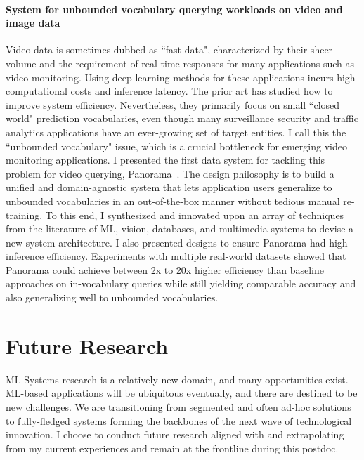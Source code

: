 \documentclass[letterpaper]{article}
\begin{document}
\paragraph{System for unbounded vocabulary querying workloads on video and image data} Video data is sometimes dubbed as ``fast data", characterized by their sheer volume and the requirement of real-time responses for many applications such as video monitoring. Using deep learning methods for these applications incurs high computational costs and inference latency. The prior art has studied how to improve system efficiency. Nevertheless, they primarily focus on small ``closed world" prediction vocabularies, even though many surveillance security and traffic analytics applications have an ever-growing set of target entities. I call this the ``unbounded vocabulary" issue, which is a crucial bottleneck for emerging video monitoring applications. I presented the first data system for tackling this problem for video querying, Panorama~\cite{panorama}. The design philosophy
is to build a unified and domain-agnostic system that lets
application users generalize to unbounded vocabularies in an
out-of-the-box manner without tedious manual re-training.
To this end, I synthesized and innovated upon an array of
techniques from the literature of ML, vision, databases, and multimedia systems to devise a new system architecture.
I also presented designs to ensure Panorama had high
inference efficiency. Experiments with multiple real-world
datasets showed that Panorama could achieve between 2x to 20x
higher efficiency than baseline approaches on in-vocabulary
queries while still yielding comparable accuracy and also
generalizing well to unbounded vocabularies.


\section*{Future Research}
ML Systems research is a relatively new domain, and many opportunities exist. ML-based applications will be ubiquitous eventually, and there are destined to be new challenges. We are transitioning from segmented and often ad-hoc solutions to fully-fledged systems forming the backbones of the next wave of technological innovation. I choose to conduct future research aligned with and extrapolating from my current experiences and remain at the frontline during this postdoc.
\end{document}
